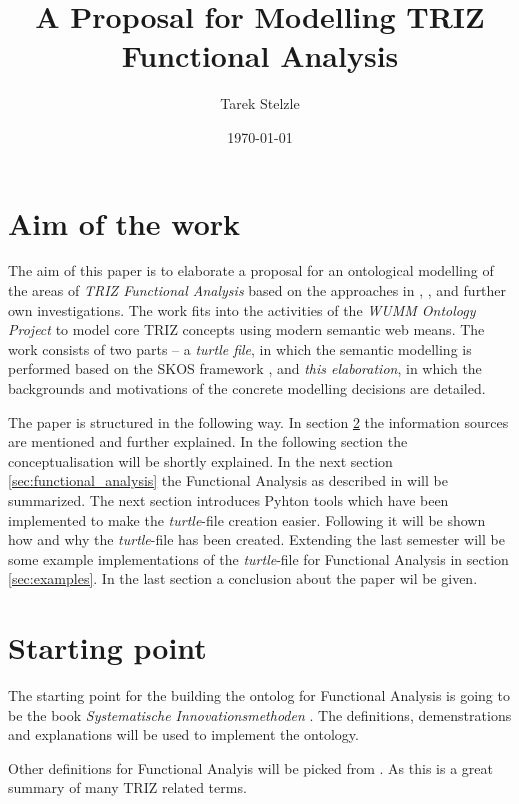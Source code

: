\documentclass[11pt,a4paper]{article}
\title{A Proposal for Modelling TRIZ Functional Analysis}
\author{Tarek Stelzle}
\date{\today}
\begin{document}
\maketitle

\section{Aim of the work}

The aim of this paper is to elaborate a proposal for an ontological modelling
of the areas of \emph{TRIZ Functional Analysis} based on the approaches
in \cite{KS}, \cite{WebinarFunctionAnalysis}, \cite{SouchkovGlossary} and further own investigations.
The work fits into the activities of the \emph{WUMM Ontology Project}
\cite{WUMM} to model core TRIZ concepts using modern semantic web means.  The
work consists of two parts -- a \emph{turtle file}, in which the semantic
modelling is performed based on the SKOS framework \cite{SKOS}, and \emph{this
  elaboration}, in which the backgrounds and motivations of the concrete
modelling decisions are detailed.

The paper is structured in the following way. 
In section \ref{sec:starting_point} the information sources are mentioned and further explained.
In the following section the conceptualisation will be shortly explained.
In the next section \ref{sec:functional_analysis} the Functional Analysis as described in \cite{KS} will be summarized.
The next section introduces Pyhton tools which have been implemented to make the \textit{turtle}-file creation easier.
Following it will be shown how and why the \textit{turtle}-file has been created.
Extending the last semester will be some example implementations of the \textit{turtle}-file for Functional Analysis in section \ref{sec:examples}.
In the last section a conclusion about the paper wil be given.

\section{Starting point} 
\label{sec:starting_point}

The starting point for the building the ontolog for Functional Analysis is going to be the book \textit{Systematische Innovationsmethoden} \cite{KS}.
The definitions, demenstrations and explanations will be used to implement the ontology.

Other definitions for Functional Analyis will be picked from \cite{SouchkovGlossary}. 
As this is a great summary of many TRIZ related terms.
\end{document}
